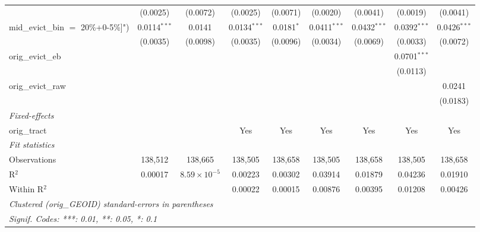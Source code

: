 \begin{tabular}{lcccccccc}
                                             & (0.0025)           & (0.0072)              & (0.0025)           & (0.0071)            & (0.0020)          & (0.0041)           & (0.0019)          & (0.0041)\\   
   mid\_evict\_bin $=$ 20\%+0-5\%]")         & 0.0114$^{***}$     & 0.0141                & 0.0134$^{***}$     & 0.0181$^{*}$        & 0.0411$^{***}$    & 0.0432$^{***}$     & 0.0392$^{***}$    & 0.0426$^{***}$\\   
                                             & (0.0035)           & (0.0098)              & (0.0035)           & (0.0096)            & (0.0034)          & (0.0069)           & (0.0033)          & (0.0072)\\   
   orig\_evict\_eb                           &                    &                       &                    &                     &                   &                    & 0.0701$^{***}$    &   \\   
                                             &                    &                       &                    &                     &                   &                    & (0.0113)          &   \\   
   orig\_evict\_raw                          &                    &                       &                    &                     &                   &                    &                   & 0.0241\\   
                                             &                    &                       &                    &                     &                   &                    &                   & (0.0183)\\   
   \midrule
   \emph{Fixed-effects}\\
   orig\_tract                               &                    &                       & Yes                & Yes                 & Yes               & Yes                & Yes               & Yes\\  
   \midrule
   \emph{Fit statistics}\\
   Observations                              & 138,512            & 138,665               & 138,505            & 138,658             & 138,505           & 138,658            & 138,505           & 138,658\\  
   R$^2$                                     & 0.00017            & $8.59\times 10^{-5}$  & 0.00223            & 0.00302             & 0.03914           & 0.01879            & 0.04236           & 0.01910\\  
   Within R$^2$                              &                    &                       & 0.00022            & 0.00015             & 0.00876           & 0.00395            & 0.01208           & 0.00426\\  
   \midrule \midrule
   \multicolumn{9}{l}{\emph{Clustered (orig\_GEOID) standard-errors in parentheses}}\\
   \multicolumn{9}{l}{\emph{Signif. Codes: ***: 0.01, **: 0.05, *: 0.1}}\\
\end{tabular}
\par\endgroup
